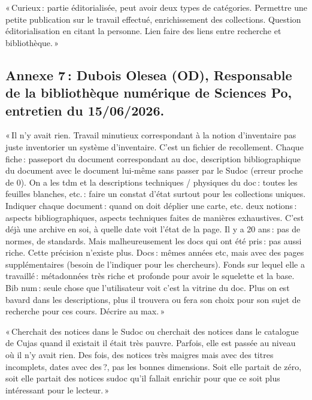 « Curieux : partie éditorialisée, peut avoir deux types de catégories. Permettre une petite publication sur le travail effectué, enrichissement des collections. Question éditorialisation en citant la personne. Lien faire des liens entre recherche et bibliothèque. » 

\subsection*{Annexe 7 : Dubois Olesea (OD), Responsable de la bibliothèque numérique de Sciences Po, entretien du 15/06/2026.}


« Il n’y avait rien. Travail minutieux correspondant à la notion d’inventaire pas juste inventorier un système d’inventaire. C’est un fichier de recollement. Chaque fiche : passeport du document correspondant au doc, description bibliographique du document avec le document lui-même sans passer par le Sudoc (erreur proche de 0). On a les tdm et la descriptions techniques / physiques du doc : toutes les feuilles blanches, etc. : faire un constat d’état surtout pour les collections uniques. Indiquer chaque document : quand on doit déplier une carte, etc. deux notions : aspects bibliographiques, aspects techniques faites de manières exhaustives. C’est déjà une archive en soi, à quelle date voit l’état de la page. Il y a 20 ans : pas de normes, de standards. Mais malheureusement les docs qui ont été pris : pas aussi riche. Cette précision n’existe plus. Docs : mêmes années etc, mais avec des pages supplémentaires (besoin de l’indiquer pour les chercheurs). Fonds sur lequel elle a travaillé : métadonnées très riche et profonde pour avoir le squelette et la base. Bib num : seule chose que l’utilisateur voit c’est la vitrine du doc. Plus on est bavard dans les descriptions, plus il trouvera ou fera son choix pour son sujet de recherche pour ces cours. Décrire au max. » 

« Cherchait des notices dans le Sudoc ou cherchait des notices dans le catalogue de Cujas quand il existait il était très pauvre. Parfois, elle est passée au niveau où il n’y avait rien. Des fois, des notices très maigres mais avec des titres incomplets, dates avec des ?, pas les bonnes dimensions. Soit elle partait de zéro, soit elle partait des notices sudoc qu’il fallait enrichir pour que ce soit plus intéressant pour le lecteur. » 



